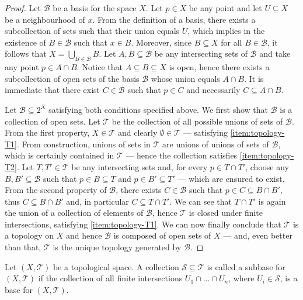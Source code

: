 \begin{proof}
Let \(\mathcal{B}\) be a basis for the space \(X\). Let \(p \in X\) be any point
and let \(U \subseteq X\) be a neighbourhood of \(x\). From the definition of a
basis, there exists a subcollection of sets such that their union equals
\(U\), which implies in the existence of \(B \in \mathcal B\) such that \(x \in
B\). Moreover, since \(B \subseteq X\) for all \(B \in \mathcal B\), it follows
that \(X = \bigcup_{B \in \mathcal B} B\). Let \(A, B \subseteq \mathcal B\) be
any intersecting sets of \(\mathcal B\) and take any point \(p \in A \cap
B\). Notice that \(A \subseteq B \subseteq X\) is open, hence there exists a
subcollection of open sets of the basis \(\mathcal B\) whose union equals \(A
\cap B\). It is immediate that there exist \(C \in \mathcal B\) such that \(p
\in C\) and necessarily \(C \subseteq A \cap B\).

Let \(\mathcal B \subseteq 2^X\) satisfying both conditions specified above. We
first show that \(\mathcal B\) is a collection of open sets. Let \(\mathcal T\)
be the collection of all possible unions of sets of \(\mathcal B\). From the
first property, \(X \in \mathcal T\) and clearly \(\emptyset \in \mathcal T\)
--- satisfying \cref{item:topology-T1}. From construction, unions of sets in
\(\mathcal T\) are unions of unions of sets of \(\mathcal B\), which is
certainly contained in \(\mathcal T\) --- hence the collection satisfies
\cref{item:topology-T2}. Let \(T, T' \in \mathcal T\) be any intersecting sets
and, for every \(p \in T \cap T'\), choose any \(B, B' \subseteq \mathcal B\)
such that \(p \in B \subseteq T\) and \(p \in B' \subseteq T'\) --- which are
ensured to exist. From the second property of \(\mathcal B\), there exists \(C
\in \mathcal B\) such that \(p \in C \subseteq B \cap B'\), thus \(C \subseteq B
\cap B'\) and, in particular \(C \subseteq T \cap T'\). We can see that \(T \cap
T'\) is again the union of a collection of elements of \(\mathcal B\), hence
\(\mathcal T\) is closed under finite intersections, satisfying
\cref{item:topology-T1}. We can now finally conclude that \(\mathcal T\) is a
topology on \(X\) and hence \(\mathcal B\) is composed of open sets of \(X\) ---
and, even better than that, \(\mathcal T\) is the unique topology generated by
\(\mathcal B\).
\end{proof}

\begin{definition}[Subbase]\label{def: subbase}
Let \((X, \mathcal T)\) be a topological space. A collection \(\mathcal S
\subseteq \mathcal T\) is called a subbase for \((X, \mathcal T)\) if the
collection of all finite intersections \(U_1 \cap \dots \cap U_n\), where
\(U_i \in \mathcal S\), is a base for \((X, \mathcal T)\).
\end{definition}

